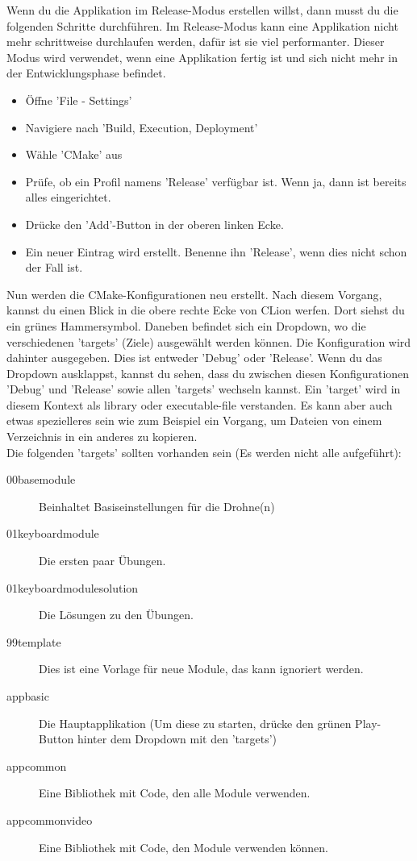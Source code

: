 Wenn du die Applikation im Release-Modus erstellen willst, dann musst du die folgenden Schritte durchführen.
Im Release-Modus kann eine Applikation nicht mehr schrittweise durchlaufen werden, dafür ist sie viel performanter.
Dieser Modus wird verwendet, wenn eine Applikation fertig ist und sich nicht mehr in der Entwicklungsphase befindet.
\begin{itemize}
    \item Öffne 'File - Settings'
    \item Navigiere nach 'Build, Execution, Deployment'
    \item Wähle 'CMake' aus
    \item Prüfe, ob ein Profil namens 'Release' verfügbar ist. Wenn ja, dann ist bereits alles eingerichtet.
    \item Drücke den 'Add'-Button in der oberen linken Ecke.
    \item Ein neuer Eintrag wird erstellt. Benenne ihn 'Release', wenn dies nicht schon der Fall ist.
\end{itemize}
Nun werden die CMake-Konfigurationen neu erstellt. Nach diesem Vorgang, kannst du einen Blick in die obere rechte Ecke
von CLion werfen. Dort siehst du ein grünes Hammersymbol. Daneben befindet sich ein Dropdown, wo die verschiedenen
'targets' (Ziele) ausgewählt werden können. Die Konfiguration wird dahinter ausgegeben. Dies ist entweder 'Debug' oder
'Release'. Wenn du das Dropdown ausklappst, kannst du sehen, dass du zwischen diesen Konfigurationen 'Debug' und 'Release'
sowie allen 'targets' wechseln kannst. Ein 'target' wird in diesem Kontext als library oder executable-file verstanden.
Es kann aber auch etwas spezielleres sein wie zum Beispiel ein Vorgang, um Dateien von einem Verzeichnis in ein anderes
zu kopieren.\\
Die folgenden 'targets' sollten vorhanden sein (Es werden nicht alle aufgeführt):
\begin{description}
    \item[00\textunderscore base\textunderscore module] Beinhaltet Basiseinstellungen für die Drohne(n)
    \item[01\textunderscore keyboard\textunderscore module] Die ersten paar Übungen.
    \item[01\textunderscore keyboard\textunderscore module\textunderscore solution] Die Lösungen zu den Übungen.
    \item[99\textunderscore template] Dies ist eine Vorlage für neue Module, das kann ignoriert werden.
    \item[app\textunderscore basic] Die Hauptapplikation (Um diese zu starten, drücke den grünen Play-Button hinter dem Dropdown mit den 'targets')
    \item[app\textunderscore common] Eine Bibliothek mit Code, den alle Module verwenden.
    \item[app\textunderscore common\textunderscore video] Eine Bibliothek mit Code, den Module verwenden können.
\end{description}

